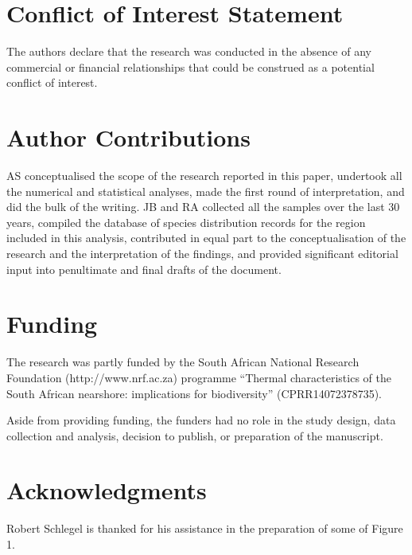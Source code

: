 \documentclass[utf8]{frontiersSCNS} %
\begin{document}
\section*{Conflict of Interest Statement}

The authors declare that the research was conducted in the absence of any commercial or financial relationships that could be construed as a potential conflict of interest.

\section*{Author Contributions}

AS conceptualised the scope of the research reported in this paper, undertook all the numerical and statistical analyses, made the first round of interpretation, and did the bulk of the writing. JB and RA collected all the samples over the last 30 years, compiled the database of species distribution records for the region included in this analysis, contributed in equal part to the conceptualisation of the research and the interpretation of the findings, and provided significant editorial input into penultimate and final drafts of the document.

\section*{Funding}
The research was partly funded by the South African National Research Foundation (http://www.nrf.ac.za) programme ``Thermal characteristics of the
South African nearshore: implications for biodiversity'' (CPRR14072378735).

Aside from providing funding, the funders had no role in the study design, data collection and analysis, decision to publish, or preparation of the manuscript.

\section*{Acknowledgments}
Robert Schlegel is thanked for his assistance in the preparation of some of Figure 1.


\end{document}
